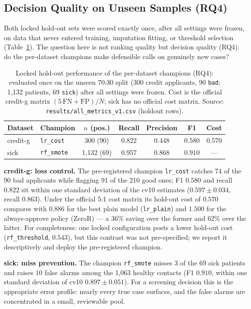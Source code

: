 \subsection{Decision Quality on Unseen Samples (RQ4)}
\label{sec:results-holdout}

Both locked hold-out sets were scored exactly once, after all settings were frozen, on data that never entered training, imputation fitting, or threshold selection (Table~\ref{tab:holdout}). The question here is not ranking quality but decision quality (RQ4): do the per-dataset champions make defensible calls on genuinely new cases?

\begin{table}[H]
\centering
\caption{Locked hold-out performance of the per-dataset champions (RQ4): evaluated once on the unseen 70:30 split (300 credit applicants, 90 \texttt{bad}; 1{,}132 patients, 69 \texttt{sick}) after all settings were frozen. Cost is the official credit-g matrix $(5\,\mathrm{FN}+\mathrm{FP})/N$; sick has no official cost matrix. Source: \texttt{results/all\_metrics\_v1.csv} (holdout rows).}
\label{tab:holdout}
\begin{tabular}{llcccc c}
\toprule
Dataset & Champion & $n$ (pos.) & Recall & Precision & F1 & Cost \\
\midrule
credit-g & \texttt{lr\_cost} & 300 (90) & 0.822 & 0.448 & $\mathbf{0.580}$ & $\mathbf{0.570}$ \\
sick & \texttt{rf\_smote} & 1{,}132 (69) & 0.957 & 0.868 & $\mathbf{0.910}$ & --- \\
\bottomrule
\end{tabular}
\end{table}

\textbf{credit-g: loss control.} The pre-registered champion \texttt{lr\_cost} catches 74 of the 90 bad applicants while flagging 91 of the 210 good ones; F1 $0.580$ and recall $0.822$ sit within one standard deviation of the cv10 estimates ($0.597\pm0.034$, recall $0.863$). Under the official 5:1 cost matrix its hold-out cost of $0.570$ compares with $0.886$ for the best plain model (\texttt{lr\_plain}) and $1.500$ for the always-approve policy (ZeroR) --- a 36\% saving over the former and 62\% over the latter. For completeness: one locked configuration posts a lower hold-out cost (\texttt{rf\_threshold}, $0.543$), but this contrast was not pre-specified; we report it descriptively and deploy the pre-registered champion.

\textbf{sick: miss prevention.} The champion \texttt{rf\_smote} misses 3 of the 69 sick patients and raises 10 false alarms among the 1{,}063 healthy contacts (F1 $0.910$, within one standard deviation of cv10 $0.897\pm0.051$). For a screening decision this is the appropriate error profile: nearly every true case surfaces, and the false alarms are concentrated in a small, reviewable pool.

